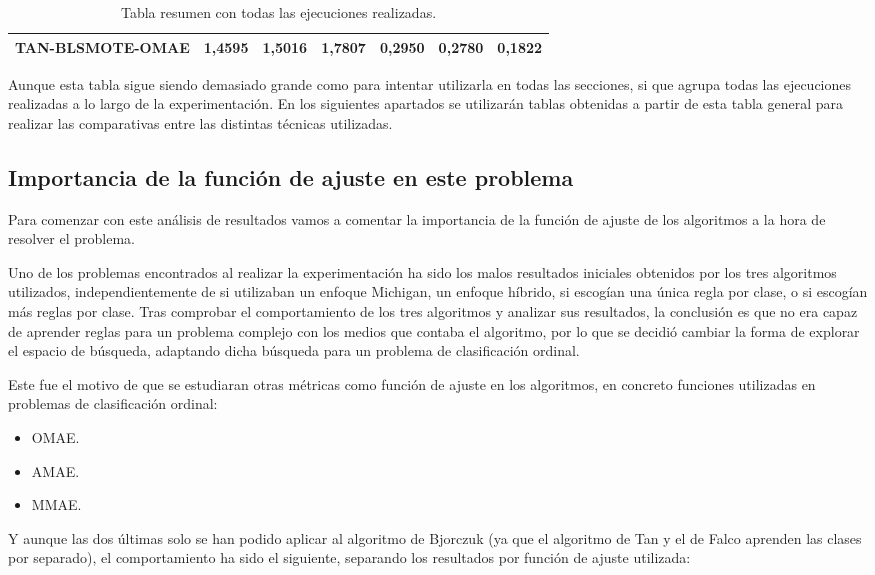 \begin{table}[H]
{\begin{tabular}{|ccccccc|}
\multicolumn{1}{|c|}{\textbf{TAN-BLSMOTE-OMAE}}   & \multicolumn{1}{c|}{1,4595}           & \multicolumn{1}{c|}{1,5016}             & \multicolumn{1}{c|}{1,7807}          & \multicolumn{1}{c|}{0,2950}           & \multicolumn{1}{c|}{0,2780}             & 0,1822       \\ \hline
\end{tabular}%
}
\caption{Tabla resumen con todas las ejecuciones realizadas.}
\end{table}

Aunque esta tabla sigue siendo demasiado grande como para intentar utilizarla en todas las secciones, si que agrupa todas las ejecuciones realizadas a lo largo de la experimentación. En los siguientes apartados se utilizarán tablas obtenidas a partir de esta tabla general para realizar las comparativas entre las distintas técnicas utilizadas.

\subsection{Importancia de la función de ajuste en este problema}

Para comenzar con este análisis de resultados vamos a comentar la importancia de la función de ajuste de los algoritmos a la hora de resolver el problema.

Uno de los problemas encontrados al realizar la experimentación ha sido los malos resultados iniciales obtenidos por los tres algoritmos utilizados, independientemente de si utilizaban un enfoque Michigan, un enfoque híbrido, si escogían una única regla por clase, o si escogían más reglas por clase. Tras comprobar el comportamiento de los tres algoritmos y analizar sus resultados, la conclusión es que no era capaz de aprender reglas para un problema complejo con los medios que contaba el algoritmo, por lo que se decidió cambiar la forma de explorar el espacio de búsqueda, adaptando dicha búsqueda para un problema de clasificación ordinal.

Este fue el motivo de que se estudiaran otras métricas como función de ajuste en los algoritmos, en concreto funciones utilizadas en problemas de clasificación ordinal:

\begin{itemize}
	\item OMAE.
	\item AMAE.
	\item MMAE.
\end{itemize}

Y aunque las dos últimas solo se han podido aplicar al algoritmo de Bjorczuk (ya que el algoritmo de Tan y el de Falco aprenden las clases por separado), el comportamiento ha sido el siguiente, separando los resultados por función de ajuste utilizada:

